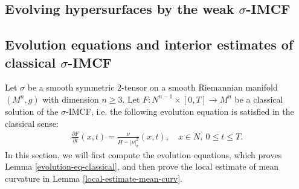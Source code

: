 \documentclass[11pt, letterpaper]{amsart}
\theoremstyle{definition}
\theoremstyle{remark}
\begin{document}
\begin{appendix}
\section{Evolving hypersurfaces by the weak $\sigma $-IMCF}\label{appen-weak}

\subsection{Evolution equations and interior estimates of classical $\sigma $-IMCF}\label{appen-sub-classical}
Let $\sigma $ be a smooth  symmetric $2$-tensor on a smooth Riemannian manifold $(M^n, g)$ with dimension $n \geq 3$. Let $F: N ^{n-1} \times [0, T] \to M^{n}$ be a classical solution of the $\sigma $-IMCF, i.e. the following evolution equation is satisfied in the classical sense:
\begin{align}
	\frac{\partial F}{ \partial t}(x,t) = \frac{\nu }{H - |\nu |^2_{\sigma }}(x, t), \quad x \in N, \ 0 \leq t \leq T.
\end{align}
In this section, we will first compute the evolution equations, which proves Lemma \ref{evolution-eq-classical}, and then prove the local estimate of mean curvature in Lemma \ref{local-estimate-mean-curv}.


\end{appendix}
\end{document}
